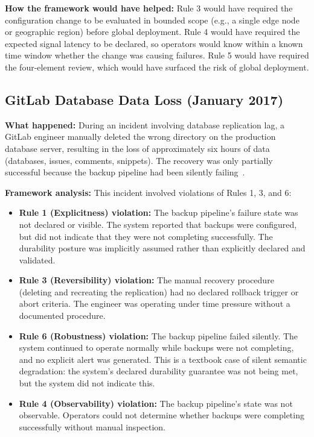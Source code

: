 \documentclass[conference]{IEEEtran}
\begin{document}
\textbf{How the framework would have helped:} Rule 3 would have required the configuration change to be evaluated in bounded scope (e.g., a single edge node or geographic region) before global deployment. Rule 4 would have required the expected signal latency to be declared, so operators would know within a known time window whether the change was causing failures. Rule 5 would have required the four-element review, which would have surfaced the risk of global deployment.

\subsection{GitLab Database Data Loss (January 2017)}

\textbf{What happened:} During an incident involving database replication lag, a GitLab engineer manually deleted the wrong directory on the production database server, resulting in the loss of approximately six hours of data (databases, issues, comments, snippets). The recovery was only partially successful because the backup pipeline had been silently failing~\cite{gitlab2017}.

\textbf{Framework analysis:} This incident involved violations of Rules 1, 3, and 6:

\begin{itemize}
    \item \textbf{Rule 1 (Explicitness) violation:} The backup pipeline's failure state was not declared or visible. The system reported that backups were configured, but did not indicate that they were not completing successfully. The durability posture was implicitly assumed rather than explicitly declared and validated.
    
    \item \textbf{Rule 3 (Reversibility) violation:} The manual recovery procedure (deleting and recreating the replication) had no declared rollback trigger or abort criteria. The engineer was operating under time pressure without a documented procedure.
    
    \item \textbf{Rule 6 (Robustness) violation:} The backup pipeline failed silently. The system continued to operate normally while backups were not completing, and no explicit alert was generated. This is a textbook case of silent semantic degradation: the system's declared durability guarantee was not being met, but the system did not indicate this.
    
    \item \textbf{Rule 4 (Observability) violation:} The backup pipeline's state was not observable. Operators could not determine whether backups were completing successfully without manual inspection.
\end{itemize}
\end{document}
